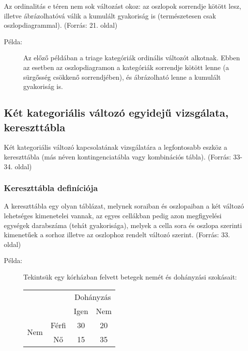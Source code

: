 \documentclass[a4paper,12pt]{article}
\begin{document}
Az ordinalitás e téren nem sok változást okoz: az oszlopok sorrendje kötött lesz, illetve ábrázolhatóvá válik a kumulált gyakoriság is (természetesen csak oszlopdiagrammal).
(Forrás: 21. oldal)

\begin{description}
\item[Példa:] Az előző példában a triage kategóriák ordinális változót alkotnak. Ebben az esetben az oszlopdiagramon a kategóriák sorrendje kötött lenne (a sürgősség csökkenő sorrendjében), és ábrázolható lenne a kumulált gyakoriság is.
\end{description}

\subsection{Két kategoriális változó egyidejű vizsgálata, kereszttábla}

Két kategoriális változó kapcsolatának vizsgálatára a legfontosabb eszköz a kereszttábla (más néven kontingenciatábla vagy kombinációs tábla).
(Forrás: 33-34. oldal)

\subsubsection{Kereszttábla definíciója}

A kereszttábla egy olyan táblázat, melynek soraiban és oszlopaiban a két változó lehetséges kimenetelei vannak, az egyes cellákban pedig azon megfigyelési egységek darabszáma (tehát gyakorisága), melyek a cella sora és oszlopa szerinti kimenetűek a sorhoz illetve az oszlophoz rendelt változó szerint.
(Forrás: 33. oldal)

\begin{description}
\item[Példa:] Tekintsük egy kórházban felvett betegek nemét és dohányzási szokásait:

\begin{center}
\begin{tabular}{|c|c|c|c|}
\hline
\multicolumn{2}{|c|}{} & \multicolumn{2}{c|}{Dohányzás} \\
\cline{3-4}
\multicolumn{2}{|c|}{} & Igen & Nem \\
\hline
\multirow{2}{*}{Nem} & Férfi & 30 & 20 \\
\cline{2-4}
 & Nő & 15 & 35 \\
\hline
\end{tabular}
\end{center}

\end{description}
\end{document}
